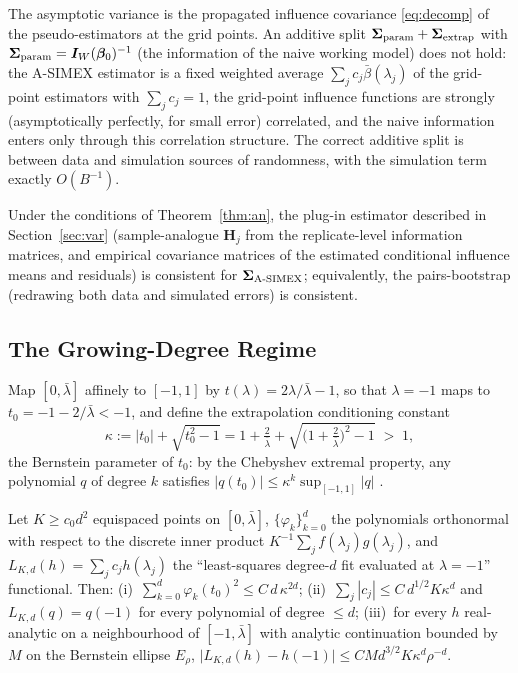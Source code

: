 \begin{remark}\label{rem:decomp}
The asymptotic variance is the propagated influence covariance
\eqref{eq:decomp} of the pseudo-estimators at the grid points. An
additive split $\bm{\Sigma}_{\mathrm{param}}+\bm{\Sigma}_{\mathrm{extrap}}$ with
$\bm{\Sigma}_{\mathrm{param}}=\bm I_W(\bm{\beta}_0)^{-1}$ (the information of the
naive working model) does not hold: the A-SIMEX estimator is a fixed
weighted average $\sum_jc_j\bar\beta(\lambda_j)$ of the grid-point
estimators with $\sum_jc_j=1$, the grid-point influence functions are
strongly (asymptotically perfectly, for small error) correlated, and
the naive information enters only through this correlation structure.
The correct additive split is between data and simulation sources of
randomness, with the simulation term exactly $O(B^{-1})$.
\end{remark}

\begin{corollary}\label{cor:var}
Under the conditions of Theorem~\ref{thm:an}, the plug-in estimator
described in Section~\ref{sec:var} (sample-analogue
$\bm H_j$ from the replicate-level information matrices, and empirical
covariance matrices of the estimated conditional influence means and
residuals) is consistent for $\bm{\Sigma}_{\textup{A-SIMEX}}$; equivalently, the
pairs-bootstrap (redrawing both data and simulated errors) is
consistent.
\end{corollary}

\subsection{The Growing-Degree Regime}\label{sec:growing}

Map $[0,\bar\lambda]$ affinely to $[-1,1]$ by
$t(\lambda)=2\lambda/\bar\lambda-1$, so that $\lambda=-1$ maps to
$t_0=-1-2/\bar\lambda<-1$, and define the extrapolation conditioning
constant
\[
  \kappa:=|t_0|+\sqrt{t_0^2-1}
  =1+\tfrac{2}{\bar\lambda}
   +\sqrt{\bigl(1+\tfrac{2}{\bar\lambda}\bigr)^2-1}\;>\;1,
\]
the Bernstein parameter of $t_0$: by the Chebyshev extremal property,
any polynomial $q$ of degree $k$ satisfies
$|q(t_0)|\le\kappa^{k}\sup_{[-1,1]}|q|$ \citep{rivlin1969}.

\begin{lemma}\label{lem:extrap}
Let $K\ge c_0d^2$ equispaced points on $[0,\bar\lambda]$,
$\{\varphi_k\}_{k=0}^{d}$ the polynomials orthonormal with respect to
the discrete inner product $K^{-1}\sum_jf(\lambda_j)g(\lambda_j)$, and
$L_{K,d}(h)=\sum_jc_jh(\lambda_j)$ the ``least-squares degree-$d$ fit
evaluated at $\lambda=-1$'' functional. Then:
(i)~$\sum_{k=0}^{d}\varphi_k(t_0)^2\le C\,d\,\kappa^{2d}$;
(ii)~$\sum_j|c_j|\le C\,d^{1/2}K\kappa^{d}$ and
$L_{K,d}(q)=q(-1)$ for every polynomial of degree $\le d$;
(iii)~for every $h$ real-analytic on a neighbourhood of
$[-1,\bar\lambda]$ with analytic continuation bounded by $M$ on the
Bernstein ellipse $E_\rho$,
$\bigl|L_{K,d}(h)-h(-1)\bigr|\le C M d^{3/2}K\kappa^{d}\rho^{-d}$.
\end{lemma}


